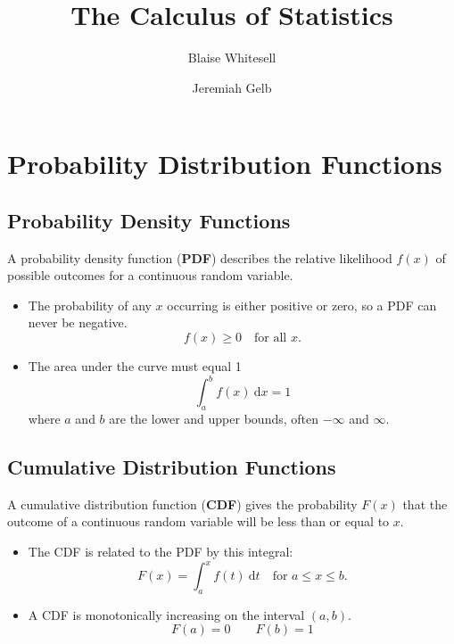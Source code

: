 \documentclass[11pt,leqno,letterpaper]{article}
\title{\Huge{The Calculus of Statistics}}
\author{\Large{Blaise Whitesell} \and \Large{Jeremiah Gelb}}
\begin{document}
\newcommand{\bdef}[1]{\textbf{#1}} %
\newcommand{\dx}{\:\mathrm{d}x} %
\newcommand{\dt}{\:\mathrm{d}t} %
\newcommand{\dth}{\:\mathrm{d}\theta} %
\newcommand{\du}{\:\mathrm{d}u} %
\newcommand{\dv}{\:\mathrm{d}v} %
\newcommand{\ddt}{\frac{\mathrm{d}}{\mathrm{d}t}} %
\theoremstyle{definition} \newtheorem{problem}{Problem}
\newcommand{\psep}{\hrule } %
\newcommand{\AM}{\textsc{am}}
\maketitle
\thispagestyle{fancy}
\vspace{2 em}
\section{Probability Distribution Functions}
\subsection{Probability Density Functions}
A probability density function (\bdef{PDF}) describes
the relative likelihood $f(x)$ of possible outcomes
for a continuous random variable.
\begin{itemize}
\item The probability of any $x$ occurring is either positive or zero,
so a PDF can never be negative.
\[
f(x) \geq 0 \quad \text{for all }x.
\]
\item The area under the curve must equal 1
\[
\int_a^b f(x)\dx = 1
\]
where $a$ and $b$ are the lower and upper bounds,
often $-\infty$ and $\infty$.
\end{itemize}
\subsection{Cumulative Distribution Functions}
A cumulative distribution function (\bdef{CDF}) gives
the probability $F(x)$ that the outcome of a
continuous random variable will be less than or equal to $x$.
\begin{itemize}
\item The CDF is related to the PDF by this integral:
\[
F(x) = \int_a^x f(t) \dt \quad \text{for } a \leq x \leq b.
\]
\item A CDF is monotonically increasing on the interval $(a,b)$.
\[
F(a) = 0 \qquad F(b) = 1
\]
\end{itemize}
\end{document}
